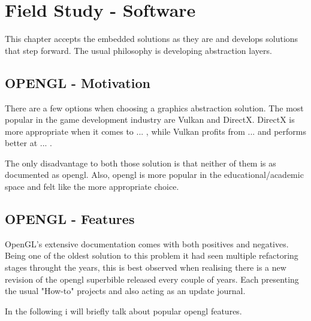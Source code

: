 

\chapter*{Field Study - Software}
  This chapter accepts the embedded solutions as they are and develops solutions that step forward. 
  The usual philosophy is developing abstraction layers.

    \section*{OPENGL - Motivation}
        There are a few options when choosing a graphics abstraction solution. The most popular in the game development industry are Vulkan and DirectX. DirectX is more appropriate when it comes to ... , while Vulkan profits from ... and performs better at ... .

        The only disadvantage to both those solution is that neither of them is as documented as opengl. Also, opengl is more popular in the educational/academic space and felt like the more appropriate choice.

    \section*{OPENGL - Features}
        OpenGL's extensive documentation comes with both positives and negatives. Being one of the oldest solution to this problem it had seen multiple refactoring stages throught the years, this is best observed when realising there is a new revision of the opengl superbible released every couple of years. Each presenting the usual "How-to" projects and also acting as an update journal.

        \pagebreak

        In the following i will briefly talk about popular opengl features.

